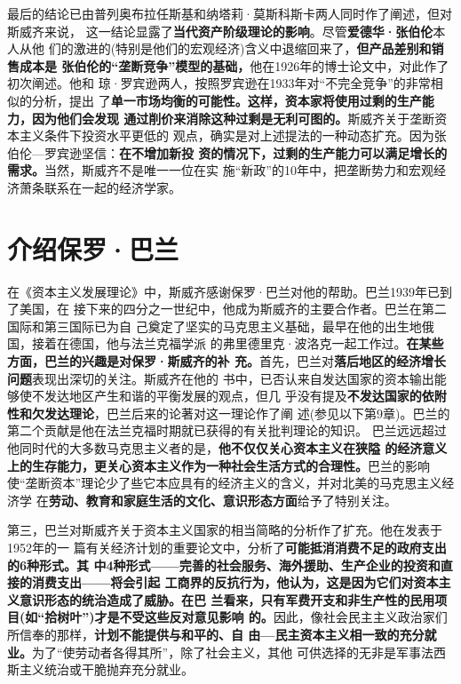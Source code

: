 最后的结论已由普列奥布拉任斯基和纳塔莉·莫斯科斯卡两人同时作了阐述，但对斯威齐来说，
这一结论显露了\textbf{当代资产阶级理论的影响}。尽管\textbf{爱德华·张伯伦}本人从他
们的激进的(特别是他们的宏观经济)含义中退缩回来了，\textbf{但产品差别和销售成本是
  张伯伦的“垄断竞争”模型的基础，}他在1926年的博士论文中，对此作了初次阐述。他和
琼·罗宾逊两人，按照罗宾逊在1933年对“不完全竞争”的非常相似的分析，提出
了\textbf{单一市场均衡的可能性。这样，资本家将使用过剩的生产能力，因为他们会发现
  通过削价来消除这种过剩是无利可图的。}斯威齐关于垄断资本主义条件下投资水平更低的
观点，确实是对上述提法的一种动态扩充。因为张伯伦—罗宾逊坚信：\textbf{在不增加新投
  资的情况下，过剩的生产能力可以满足增长的需求。}当然，斯威齐不是唯一一位在实
施“新政”的10年中，把垄断势力和宏观经济萧条联系在一起的经济学家。

\section{介绍保罗·巴兰}
在《资本主义发展理论》中，斯威齐感谢保罗·巴兰对他的帮助。巴兰1939年已到了美国，在
接下来的四分之一世纪中，他成为斯威齐的主要合作者。巴兰在第二国际和第三国际已为自
己奠定了坚实的马克思主义基础，最早在他的出生地俄国，接着在德国，他与法兰克福学派
的弗里德里克·波洛克一起工作过。\textbf{在某些方面，巴兰的兴趣是对保罗·斯威齐的补
  充。}首先，巴兰对\textbf{落后地区的经济增长问题}表现出深切的关注。斯威齐在他的
书中，已否认来自发达国家的资本输出能够使不发达地区产生和谐的平衡发展的观点，但几
乎没有提及\textbf{不发达国家的依附性和欠发达理论}，巴兰后来的论著对这一理论作了阐
述(参见以下第9章)。巴兰的第二个贡献是他在法兰克福时期就已获得的有关批判理论的知识。
巴兰远远超过他同时代的大多数马克思主义者的是，\textbf{他不仅仅关心资本主义在狭隘
  的经济意义上的生存能力，更关心资本主义作为一种社会生活方式的合理性。}巴兰的影响
使“垄断资本”理论少了些它本应具有的经济主义的含义，并对北美的马克思主义经济学
在\textbf{劳动、教育和家庭生活的文化、意识形态方面}给予了特别关注。

第三，巴兰对斯威齐关于资本主义国家的相当简略的分析作了扩充。他在发表于1952年的一
篇有关经济计划的重要论文中，分析了\textbf{可能抵消消费不足的政府支出的6种形式。其
  中4种形式——完善的社会服务、海外援助、生产企业的投资和直接的消费支出——将会引起
  工商界的反抗行为，他认为，这是因为它们对资本主义意识形态的统治造成了威胁。在巴
  兰看来，只有军费开支和非生产性的民用项目(如“拾树叶”)才是不受这些反对意见影响
  的。}因此，像社会民主主义政治家们所信奉的那样，\textbf{计划不能提供与和平的、自
  由—民主资本主义相一致的充分就业。}为了“使劳动者各得其所”，除了社会主义，其他
可供选择的无非是军事法西斯主义统治或干脆抛弃充分就业。

